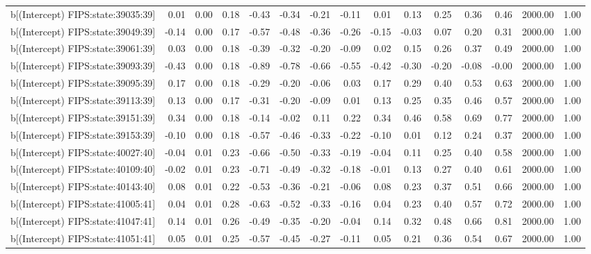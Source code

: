 \begin{table}[ht]
\begin{tabular}{rrrrrrrrrrrrrrr}
  b[(Intercept) FIPS:state:39035:39] & 0.01 & 0.00 & 0.18 & -0.43 & -0.34 & -0.21 & -0.11 & 0.01 & 0.13 & 0.25 & 0.36 & 0.46 & 2000.00 & 1.00 \\ 
  b[(Intercept) FIPS:state:39049:39] & -0.14 & 0.00 & 0.17 & -0.57 & -0.48 & -0.36 & -0.26 & -0.15 & -0.03 & 0.07 & 0.20 & 0.31 & 2000.00 & 1.00 \\ 
  b[(Intercept) FIPS:state:39061:39] & 0.03 & 0.00 & 0.18 & -0.39 & -0.32 & -0.20 & -0.09 & 0.02 & 0.15 & 0.26 & 0.37 & 0.49 & 2000.00 & 1.00 \\ 
  b[(Intercept) FIPS:state:39093:39] & -0.43 & 0.00 & 0.18 & -0.89 & -0.78 & -0.66 & -0.55 & -0.42 & -0.30 & -0.20 & -0.08 & -0.00 & 2000.00 & 1.00 \\ 
  b[(Intercept) FIPS:state:39095:39] & 0.17 & 0.00 & 0.18 & -0.29 & -0.20 & -0.06 & 0.03 & 0.17 & 0.29 & 0.40 & 0.53 & 0.63 & 2000.00 & 1.00 \\ 
  b[(Intercept) FIPS:state:39113:39] & 0.13 & 0.00 & 0.17 & -0.31 & -0.20 & -0.09 & 0.01 & 0.13 & 0.25 & 0.35 & 0.46 & 0.57 & 2000.00 & 1.00 \\ 
  b[(Intercept) FIPS:state:39151:39] & 0.34 & 0.00 & 0.18 & -0.14 & -0.02 & 0.11 & 0.22 & 0.34 & 0.46 & 0.58 & 0.69 & 0.77 & 2000.00 & 1.00 \\ 
  b[(Intercept) FIPS:state:39153:39] & -0.10 & 0.00 & 0.18 & -0.57 & -0.46 & -0.33 & -0.22 & -0.10 & 0.01 & 0.12 & 0.24 & 0.37 & 2000.00 & 1.00 \\ 
  b[(Intercept) FIPS:state:40027:40] & -0.04 & 0.01 & 0.23 & -0.66 & -0.50 & -0.33 & -0.19 & -0.04 & 0.11 & 0.25 & 0.40 & 0.58 & 2000.00 & 1.00 \\ 
  b[(Intercept) FIPS:state:40109:40] & -0.02 & 0.01 & 0.23 & -0.71 & -0.49 & -0.32 & -0.18 & -0.01 & 0.13 & 0.27 & 0.40 & 0.61 & 2000.00 & 1.00 \\ 
  b[(Intercept) FIPS:state:40143:40] & 0.08 & 0.01 & 0.22 & -0.53 & -0.36 & -0.21 & -0.06 & 0.08 & 0.23 & 0.37 & 0.51 & 0.66 & 2000.00 & 1.00 \\ 
  b[(Intercept) FIPS:state:41005:41] & 0.04 & 0.01 & 0.28 & -0.63 & -0.52 & -0.33 & -0.16 & 0.04 & 0.23 & 0.40 & 0.57 & 0.72 & 2000.00 & 1.00 \\ 
  b[(Intercept) FIPS:state:41047:41] & 0.14 & 0.01 & 0.26 & -0.49 & -0.35 & -0.20 & -0.04 & 0.14 & 0.32 & 0.48 & 0.66 & 0.81 & 2000.00 & 1.00 \\ 
  b[(Intercept) FIPS:state:41051:41] & 0.05 & 0.01 & 0.25 & -0.57 & -0.45 & -0.27 & -0.11 & 0.05 & 0.21 & 0.36 & 0.54 & 0.67 & 2000.00 & 1.00 \\ 

\end{tabular}
\end{table}
